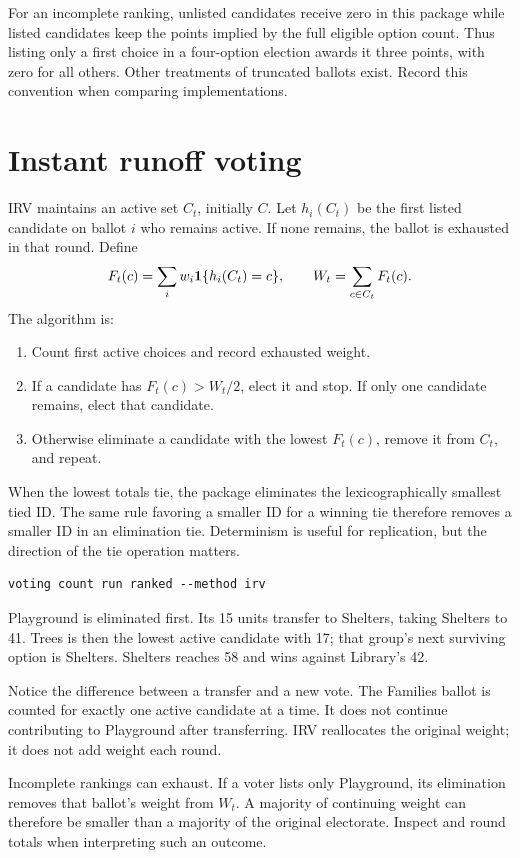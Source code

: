 For an incomplete ranking, unlisted candidates receive zero in this package while listed candidates keep the points implied by the full eligible option count. Thus listing only a first choice in a four-option election awards it three points, with zero for all others. Other treatments of truncated ballots exist. Record this convention when comparing implementations.

\section{Instant runoff voting}
IRV maintains an active set $C_t$, initially $C$. Let $h_i(C_t)$ be the first listed candidate on ballot $i$ who remains active. If none remains, the ballot is exhausted in that round. Define
\[
F_t(c)=\sum_i w_i\mathbf{1}\{h_i(C_t)=c\},\qquad
W_t=\sum_{c\in C_t}F_t(c).
\]
The algorithm is:
\begin{enumerate}
\item Count first active choices and record exhausted weight.
\item If a candidate has $F_t(c)>W_t/2$, elect it and stop. If only one candidate remains, elect that candidate.
\item Otherwise eliminate a candidate with the lowest $F_t(c)$, remove it from $C_t$, and repeat.
\end{enumerate}
When the lowest totals tie, the package eliminates the lexicographically smallest tied ID. The same rule favoring a smaller ID for a winning tie therefore removes a smaller ID in an elimination tie. Determinism is useful for replication, but the direction of the tie operation matters.
\begin{lstlisting}[style=votingrun]
voting count run ranked --method irv
\end{lstlisting}
Playground is eliminated first. Its 15 units transfer to Shelters, taking Shelters to 41. Trees is then the lowest active candidate with 17; that group's next surviving option is Shelters. Shelters reaches 58 and wins against Library's 42.

Notice the difference between a transfer and a new vote. The Families ballot is counted for exactly one active candidate at a time. It does not continue contributing to Playground after transferring. IRV reallocates the original weight; it does not add weight each round.

Incomplete rankings can exhaust. If a voter lists only Playground, its elimination removes that ballot's weight from $W_t$. A majority of continuing weight can therefore be smaller than a majority of the original electorate. Inspect  and round totals when interpreting such an outcome.

